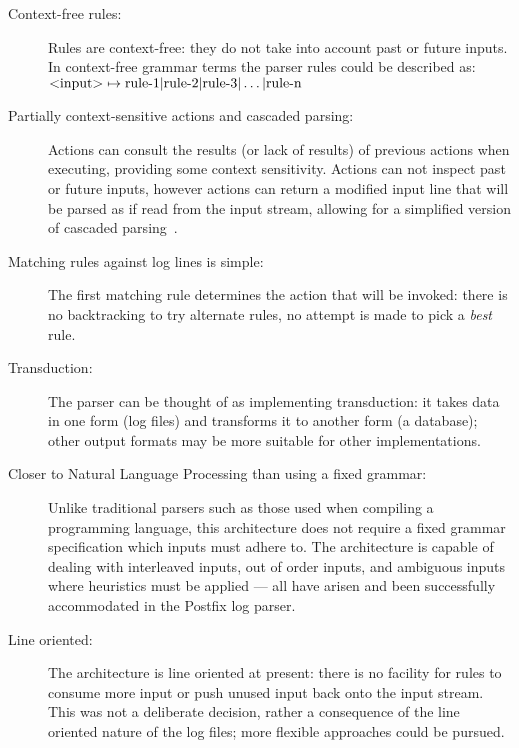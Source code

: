 \documentclass{svmult}
\begin{document}
\begin{description}

    \item [Context-free rules:]  Rules are context-free: they do not take
        into account past or future inputs.  In context-free grammar terms
        the parser rules could be described as:
        $\text{\textless{}input\textgreater{}} \mapsto \text{rule-1} |
        \text{rule-2} | \text{rule-3} | \dots | \text{rule-n}$

    \item [Partially context-sensitive actions and cascaded parsing:]
        Actions can consult the results (or lack of results) of previous
        actions when executing, providing some context sensitivity.
        Actions can not inspect past or future inputs, however actions
        can return a modified input line that will be parsed as if read
        from the input stream, allowing for a simplified version of
        cascaded parsing~\cite{cascaded-parsing}.

    \item [Matching rules against log lines is simple:]  The first matching
        rule determines the action that will be invoked: there is no
        backtracking to try alternate rules, no attempt is made to pick a
        \textit{best\/} rule.

    \item [Transduction:]  The parser can be thought of as implementing
        transduction: it takes data in one form (log files) and transforms
        it to another form (a database); other output formats may be more
        suitable for other implementations.

    \item [Closer to Natural Language Processing than using a fixed
        grammar:] Unlike traditional parsers such as those used when
        compiling a programming language, this architecture does not
        require a fixed grammar specification which inputs must adhere to.
        The architecture is capable of dealing with interleaved inputs, out
        of order inputs, and ambiguous inputs where heuristics must be
        applied --- all have arisen and been successfully accommodated in
        the Postfix log parser.

    \item [Line oriented:]  The architecture is line oriented at present:
        there is no facility for rules to consume more input or push unused
        input back onto the input stream.  This was not a deliberate
        decision, rather a consequence of the line oriented nature of the
        log files; more flexible approaches could be pursued.

\end{description}
\end{document}
